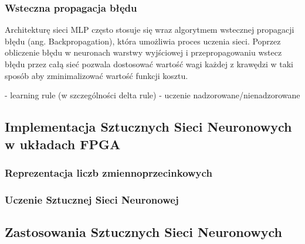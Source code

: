 \subsubsection{Wsteczna propagacja błędu}
Architekturę sieci MLP często stosuje się wraz algorytmem wstecznej 
propagacji błędu (ang. Backpropagation), która umożliwia proces uczenia sieci.
Poprzez obliczenie błędu w neuronach warstwy wyjściowej i przepropagowaniu 
wstecz błędu przez całą sieć pozwala dostosować wartość wagi każdej z krawędzi 
w taki sposób aby zminimalizować wartość funkcji kosztu.

- learning rule (w szczególności delta rule)
- uczenie nadzorowane/nienadzorowane



\subsection{Implementacja Sztucznych Sieci Neuronowych w układach FPGA}
\subsubsection{Reprezentacja liczb zmiennoprzecinkowych}
\subsubsection{Uczenie Sztucznej Sieci Neuronowej}
\subsection{Zastosowania Sztucznych Sieci Neuronowych}